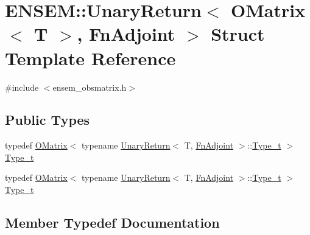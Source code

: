 \hypertarget{structENSEM_1_1UnaryReturn_3_01OMatrix_3_01T_01_4_00_01FnAdjoint_01_4}{}\section{E\+N\+S\+EM\+:\+:Unary\+Return$<$ O\+Matrix$<$ T $>$, Fn\+Adjoint $>$ Struct Template Reference}
\label{structENSEM_1_1UnaryReturn_3_01OMatrix_3_01T_01_4_00_01FnAdjoint_01_4}


{\ttfamily \#include $<$ensem\+\_\+obsmatrix.\+h$>$}

\subsection*{Public Types}
\begin{DoxyCompactItemize}
\item 
typedef \mbox{\hyperlink{classENSEM_1_1OMatrix}{O\+Matrix}}$<$ typename \mbox{\hyperlink{structENSEM_1_1UnaryReturn}{Unary\+Return}}$<$ T, \mbox{\hyperlink{structENSEM_1_1FnAdjoint}{Fn\+Adjoint}} $>$\+::\mbox{\hyperlink{structENSEM_1_1UnaryReturn_3_01OMatrix_3_01T_01_4_00_01FnAdjoint_01_4_aa00f2dd53b3936a34ade7e353b17b138}{Type\+\_\+t}} $>$ \mbox{\hyperlink{structENSEM_1_1UnaryReturn_3_01OMatrix_3_01T_01_4_00_01FnAdjoint_01_4_aa00f2dd53b3936a34ade7e353b17b138}{Type\+\_\+t}}
\item 
typedef \mbox{\hyperlink{classENSEM_1_1OMatrix}{O\+Matrix}}$<$ typename \mbox{\hyperlink{structENSEM_1_1UnaryReturn}{Unary\+Return}}$<$ T, \mbox{\hyperlink{structENSEM_1_1FnAdjoint}{Fn\+Adjoint}} $>$\+::\mbox{\hyperlink{structENSEM_1_1UnaryReturn_3_01OMatrix_3_01T_01_4_00_01FnAdjoint_01_4_aa00f2dd53b3936a34ade7e353b17b138}{Type\+\_\+t}} $>$ \mbox{\hyperlink{structENSEM_1_1UnaryReturn_3_01OMatrix_3_01T_01_4_00_01FnAdjoint_01_4_aa00f2dd53b3936a34ade7e353b17b138}{Type\+\_\+t}}
\end{DoxyCompactItemize}


\subsection{Member Typedef Documentation}
\mbox{\label{structENSEM_1_1UnaryReturn_3_01OMatrix_3_01T_01_4_00_01FnAdjoint_01_4_aa00f2dd53b3936a34ade7e353b17b138}} 
